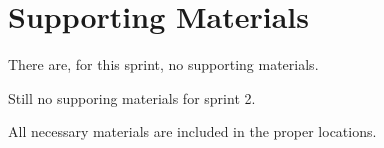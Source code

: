 
\chapter{Supporting Materials}
There are, for this sprint, no supporting materials.

Still no supporing materials for sprint 2.

All necessary materials are included in the proper locations.
